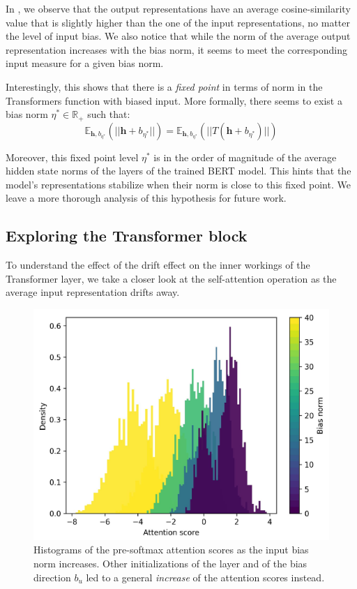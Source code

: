 In , we observe that the output representations have an average cosine-similarity value that is slightly higher than the one of the input representations, no matter the level of input bias. We also notice that while the norm of the average output representation increases with the bias norm, it seems to meet the corresponding input measure for a given bias norm.

Interestingly, this shows that there is a \textit{fixed point} in terms of norm in the Transformers function with biased input. More formally, there seems to exist a bias norm $\eta^* \in \mathbb{R}_+$ such that: $$\mathbb{E}_{\mathbf{h}, b_{\eta^*}}(||\mathbf{h} + b_{\eta^*}||) = \mathbb{E}_{\mathbf{h}, b_{\eta^*}}(||T(\mathbf{h} + b_{\eta^*})||)$$

Moreover, this fixed point level $\eta^*$ is in the order of magnitude of the average hidden state norms of the layers of the trained BERT model. This hints that the model's representations stabilize when their norm is close to this fixed point. We leave a more thorough analysis of this hypothesis for future work.

\subsection{Exploring the Transformer block}

To understand the effect of the drift effect on the inner workings of the Transformer layer, we take a closer look at the self-attention operation as the average input representation drifts away.

\begin{figure}[ht]
    \centering
    \includegraphics[width=0.6\linewidth]{sources/part_1/anisotropy/imgs/trained_bert_base_att_scores.pdf}
    \caption{Histograms of the pre-softmax attention scores as the input bias norm increases. Other initializations of the layer and of the bias direction $b_u$ led to a general \textit{increase} of the attention scores instead.}
    \label{fig:attscore_trained_transformer}
\end{figure}


